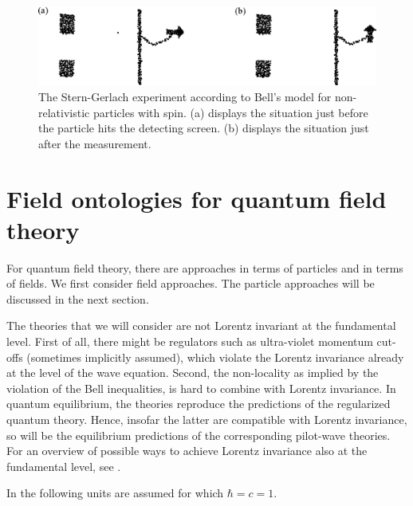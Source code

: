 \documentclass[11pt]{article}
\begin{document}
\begin{figure}
\begin{center}
\includegraphics{dbb.eps}
\end{center}
\caption{\label{dbb}The Stern-Gerlach experiment according to Bell's model for non-relativistic particles with spin. (a) displays the situation just before the particle hits the detecting screen. (b) displays the situation just after the measurement.}
\end{figure}
  


\section{Field ontologies for quantum field theory}\label{fields}
For quantum field theory, there are approaches in terms of particles and in terms of fields. We first consider field approaches. The particle approaches will be discussed in the next section.

The theories that we will consider are not Lorentz invariant at the fundamental level. First of all, there might be regulators such as ultra-violet momentum cut-offs (sometimes implicitly assumed), which violate the Lorentz invariance already at the level of the wave equation. Second, the non-locality as implied by the violation of the Bell inequalities, is hard to combine with Lorentz invariance. In quantum equilibrium, the theories reproduce the predictions of the regularized quantum theory. Hence, insofar the latter are compatible with Lorentz invariance, so will be the equilibrium predictions of the corresponding pilot-wave theories. For an overview of possible ways to achieve Lorentz invariance also at the fundamental level, see \cite{tumulka06}. 

In the following units are assumed for which $\hbar=c=1$.
\end{document}
